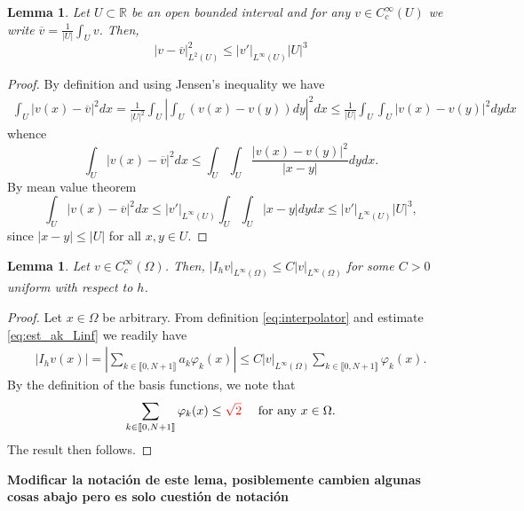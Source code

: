 \documentclass[10 pt]{article}
\newcommand\blue[1]{{\color{blue}\textbf{#1}}}
\newcommand\inter[1]{\llbracket #1\rrbracket}
\newtheorem{lemma}[theorem]{Lemma}
\numberwithin{equation}{section}
\def\R{\mathbb{R}}
\newcommand{\B}[1]{{\color{red} #1}}  %
\begin{document}
\begin{lemma}\label{lem:poincare_type}
Let $U\subset \R$ be an open bounded interval and for any $v\in C_c^\infty(U)$ we write $\overline v=\frac{1}{|U|}\int_{U}v$. Then,
%
\begin{equation}
    |v-\overline{v}|_{L^2(U)}^2\leq |v'|_{L^\infty(U)}|U|^3
\end{equation}
%
\end{lemma}
%
\begin{proof}
By definition and using Jensen's inequality we have
%
\begin{align}
    \int_{U}|v(x)-\overline{v}|^2dx=\frac{1}{|U|^2}\int_{U}\left|\int_{U}(v(x)-v(y))dy\right|^2dx \leq \frac{1}{|U|}\int_{U}\int_{U}|v(x)-v(y)|^2dy dx
\end{align}
%
whence
%
\begin{equation}
    \int_{U}|v(x)-\overline{v}|^2dx \leq \int_{U}\int_{U}\frac{|v(x)-v(y)|^2}{|x-y|}dy dx.
\end{equation}
%
By mean value theorem
%
\begin{equation}
    \int_{U}|v(x)-\overline{v}|^2dx 
    \leq |v'|_{L^\infty(U)}\int_{U}\int_{U}|x-y|dy dx
    \leq |v'|_{L^\infty(U)}|U|^3,
\end{equation}
%
since $|x-y|\leq |U|$ for all $x,y\in U$.
\end{proof}

\begin{lemma}\label{lem:inter_l_infty}
    Let $v\in C_c^\infty(\Omega)$. Then, $|I_h v|_{L^\infty(\Omega)}\leq C|v|_{L^\infty(\Omega)}$ for some $C>0$ uniform with respect to $h$.
\end{lemma}
%
\begin{proof}
Let $x\in \Omega$ be arbitrary. From definition \eqref{eq:interpolator} and estimate \eqref{eq:est_ak_Linf} we readily have
%
\begin{align*}
    |I_h v(x)|=\left|\sum_{k\in\inter{0,N+1}}a_k \varphi_k(x)\right| \leq C|v|_{L^\infty(\Omega)}\sum_{k\in\inter{0,N+1}}\varphi_k(x).
\end{align*}
%
By the definition of the basis functions, we note that 
%
\begin{equation*}
    \sum_{k\in\inter{0,N+1}}\varphi_k(x)\leq \B{\sqrt{2}} \quad \textnormal{ for any $x\in\Omega$}.
\end{equation*}
The result then follows. 
\end{proof}

\blue{Modificar la notación de este lema, posiblemente cambien algunas cosas abajo pero es solo cuestión de notación}
\end{document}
